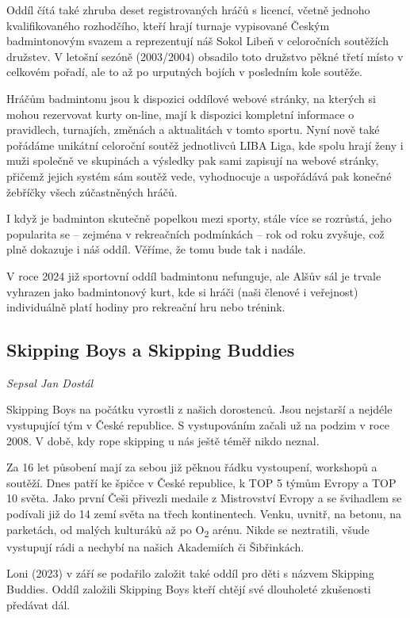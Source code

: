 Oddíl čítá také zhruba deset registrovaných hráčů s licencí, včetně
jednoho kvalifikovaného rozhodčího, kteří hrají turnaje vypisované
Českým badmintonovým svazem a reprezentují náš Sokol Libeň v celoročních
soutěžích družstev. V letošní sezóně (2003/2004) obsadilo toto družstvo
pěkné třetí místo v celkovém pořadí, ale to až po urputných bojích v
posledním kole soutěže.

Hráčům badmintonu jsou k dispozici oddílové webové stránky, na kterých
si mohou rezervovat kurty on-line, mají k dispozici kompletní informace
o pravidlech, turnajích, změnách a aktualitách v tomto sportu. Nyní nově
také pořádáme unikátní celoroční soutěž jednotlivců LIBA Liga, kde spolu
hrají ženy i muži společně ve skupinách a výsledky pak sami zapisují na
webové stránky, přičemž jejich systém sám soutěž vede, vyhodnocuje a
uspořádává pak konečné žebříčky všech zúčastněných hráčů.

I když je badminton skutečně popelkou mezi sporty, stále více se
rozrůstá, jeho popularita se -- zejména v rekreačních podmínkách -- rok
od roku zvyšuje, což plně dokazuje i náš oddíl. Věříme, že tomu bude tak
i nadále.

V roce 2024 již sportovní oddíl badmintonu nefunguje, ale Alšův sál je
trvale vyhrazen jako badmintonový kurt, kde si hráči (naši členové i
veřejnost) individuálně platí hodiny pro rekreační hru nebo trénink.

\subsection{Skipping Boys a Skipping
Buddies}\label{skipping-boys-a-skipping-buddies}

\emph{Sepsal Jan Dostál}

Skipping Boys na počátku vyrostli z našich dorostenců. Jsou nejstarší a
nejdéle vystupující tým v České republice. S vystupováním začali už na
podzim v roce 2008. V době, kdy rope skipping u nás ještě téměř nikdo
neznal.

Za 16 let působení mají za sebou již pěknou řádku vystoupení, workshopů
a soutěží. Dnes patří ke špičce v České republice, k TOP 5 týmům Evropy
a TOP 10 světa. Jako první Češi přivezli medaile z Mistrovství Evropy a
se švihadlem se podívali již do 14 zemí světa na třech kontinentech.
Venku, uvnitř, na betonu, na parketách, od malých kulturáků až po
O\textsubscript{2} arénu. Nikde se neztratili, všude vystupují rádi a
nechybí na našich Akademiích či Šibřinkách.

Loni (2023) v září se podařilo založit také oddíl pro děti s názvem
Skipping Buddies. Oddíl založili Skipping Boys kteří chtějí své
dlouholeté zkušenosti předávat dál.

